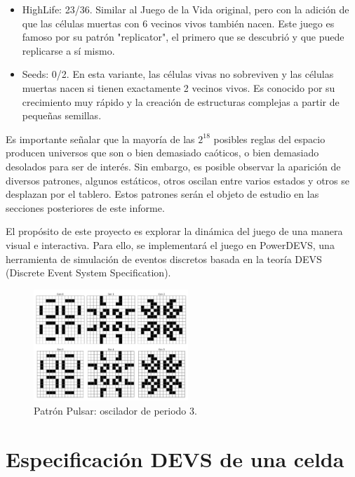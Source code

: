 \documentclass[]{article}
\begin{document}
\begin{itemize}
  \item HighLife: 23/36. Similar al Juego de la Vida original, pero con la adición de que las células muertas con 6 vecinos vivos también nacen. Este juego es famoso por su patrón "replicator", el primero que se descubrió y que puede replicarse a sí mismo.
  \item Seeds: 0/2. En esta variante, las células vivas no sobreviven y las células muertas nacen si tienen exactamente 2 vecinos vivos. Es conocido por su crecimiento muy rápido y la creación de estructuras complejas a partir de pequeñas semillas.
\end{itemize}

Es importante señalar que la mayoría de las $2^{18}$ posibles reglas del espacio producen universos que son o bien demasiado caóticos, o bien demasiado desolados para ser de interés. Sin embargo, es posible observar la aparición de diversos patrones, algunos  estáticos, otros oscilan entre varios estados y otros se desplazan por el tablero. Estos patrones serán el objeto de estudio en las secciones posteriores de este informe.

El propósito de este proyecto es explorar la dinámica del juego de una manera visual e interactiva. Para ello, se implementará el juego en PowerDEVS, una herramienta de simulación de eventos discretos basada en la teoría DEVS (Discrete Event System Specification).

\begin{figure}[H]
  \centering
  \includegraphics[width=0.52\textwidth]{../assets/oscillator/pulsar/pulsar.png}
  \caption{Patrón Pulsar: oscilador de periodo 3.}
  \label{fig:pulsar_0}
  \end{figure}



\section{Especificación DEVS de una celda}\label{sec:esp}
\end{document}
